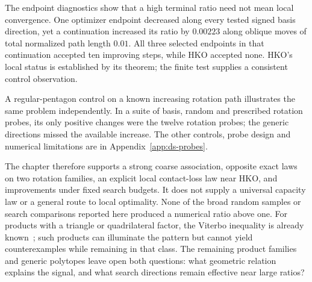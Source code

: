 The endpoint diagnostics show that a high terminal ratio need not mean
local convergence. One optimizer endpoint decreased along every tested
signed basis direction, yet a continuation increased its ratio by
$0.00223$ along oblique moves of total normalized path length $0.01$.
All three selected endpoints in that continuation accepted ten improving
steps, while HKO accepted none. HKO's local status is established by its
theorem; the finite test supplies a consistent control observation.

A regular-pentagon control on a known increasing rotation path illustrates
the same problem independently. In a suite of basis, random and prescribed
rotation probes, its only positive changes were the twelve rotation
probes; the generic directions missed the available increase. The other
controls, probe design and numerical limitations are in
Appendix~\ref{app:ds-probes}.

The chapter therefore supports a strong coarse association, opposite exact
laws on two rotation families, an explicit local contact-loss law near HKO,
and improvements under fixed search budgets. It does
not supply a universal capacity law or a general route to local optimality.
None of the broad random samples or search comparisons reported here produced a numerical
ratio above one. For products with a triangle or quadrilateral factor,
the Viterbo inequality is already known~\cite[Theorem~1.2 and Section~4]{dsBMP2026};
such products can illuminate the pattern but cannot yield counterexamples
while remaining in that class. The remaining product families and generic
polytopes leave open both questions: what geometric relation explains the
signal, and what search directions remain effective near large ratios?
